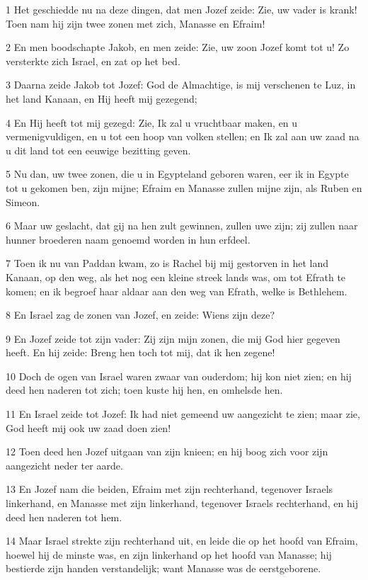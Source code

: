 \par 1 Het geschiedde nu na deze dingen, dat men Jozef zeide: Zie, uw vader is krank! Toen nam hij zijn twee zonen met zich, Manasse en Efraim!
\par 2 En men boodschapte Jakob, en men zeide: Zie, uw zoon Jozef komt tot u! Zo versterkte zich Israel, en zat op het bed.
\par 3 Daarna zeide Jakob tot Jozef: God de Almachtige, is mij verschenen te Luz, in het land Kanaan, en Hij heeft mij gezegend;
\par 4 En Hij heeft tot mij gezegd: Zie, Ik zal u vruchtbaar maken, en u vermenigvuldigen, en u tot een hoop van volken stellen; en Ik zal aan uw zaad na u dit land tot een eeuwige bezitting geven.
\par 5 Nu dan, uw twee zonen, die u in Egypteland geboren waren, eer ik in Egypte tot u gekomen ben, zijn mijne; Efraim en Manasse zullen mijne zijn, als Ruben en Simeon.
\par 6 Maar uw geslacht, dat gij na hen zult gewinnen, zullen uwe zijn; zij zullen naar hunner broederen naam genoemd worden in hun erfdeel.
\par 7 Toen ik nu van Paddan kwam, zo is Rachel bij mij gestorven in het land Kanaan, op den weg, als het nog een kleine streek lands was, om tot Efrath te komen; en ik begroef haar aldaar aan den weg van Efrath, welke is Bethlehem.
\par 8 En Israel zag de zonen van Jozef, en zeide: Wiens zijn deze?
\par 9 En Jozef zeide tot zijn vader: Zij zijn mijn zonen, die mij God hier gegeven heeft. En hij zeide: Breng hen toch tot mij, dat ik hen zegene!
\par 10 Doch de ogen van Israel waren zwaar van ouderdom; hij kon niet zien; en hij deed hen naderen tot zich; toen kuste hij hen, en omhelsde hen.
\par 11 En Israel zeide tot Jozef: Ik had niet gemeend uw aangezicht te zien; maar zie, God heeft mij ook uw zaad doen zien!
\par 12 Toen deed hen Jozef uitgaan van zijn knieen; en hij boog zich voor zijn aangezicht neder ter aarde.
\par 13 En Jozef nam die beiden, Efraim met zijn rechterhand, tegenover Israels linkerhand, en Manasse met zijn linkerhand, tegenover Israels rechterhand, en hij deed hen naderen tot hem.
\par 14 Maar Israel strekte zijn rechterhand uit, en leide die op het hoofd van Efraim, hoewel hij de minste was, en zijn linkerhand op het hoofd van Manasse; hij bestierde zijn handen verstandelijk; want Manasse was de eerstgeborene.
